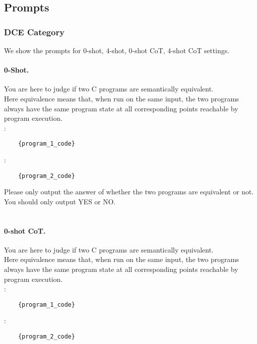 \subsection{Prompts}
\label{subsec:app:prompt}

\lstset{style=mystyle}

\subsubsection{DCE Category}
We show the prompts for 0-shot, 4-shot, 0-shot CoT, 4-shot CoT settings.

\paragraph{0-Shot.} You are here to judge if two C programs are semantically equivalent.\\
    Here equivalence means that, when run on the same input, the two programs always have the same program state at all corresponding points reachable by program execution.\\
    \text{    [Program 1]}:\\
    \begin{lstlisting}
    {program_1_code}
    \end{lstlisting}
    \text{    [Program 2]}:\\
    \begin{lstlisting}
    {program_2_code}
    \end{lstlisting}
    
    Please only output the answer of whether the two programs are equivalent or not. You should only output YES or NO.\\
\\

\paragraph{0-shot CoT.} You are here to judge if two C programs are semantically equivalent.\\
    Here equivalence means that, when run on the same input, the two programs always have the same program state at all corresponding points reachable by program execution.\\
    \text{    [Program 1]}:
    \begin{lstlisting}
    {program_1_code}
    \end{lstlisting}
    \text{    [Program 2]}:\\
    \begin{lstlisting}
    {program_2_code}
    \end{lstlisting}
    
